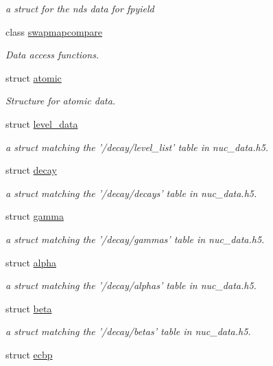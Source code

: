 \begin{DoxyCompactItemize}
\begin{DoxyCompactList}\small\item\em a struct for the nds data for fpyield \end{DoxyCompactList}\item 
class \hyperlink{classpyne_1_1swapmapcompare}{swapmapcompare}
\begin{DoxyCompactList}\small\item\em Data access functions. \end{DoxyCompactList}\item 
struct \hyperlink{structpyne_1_1atomic}{atomic}
\begin{DoxyCompactList}\small\item\em Structure for atomic data. \end{DoxyCompactList}\item 
struct \hyperlink{structpyne_1_1level__data}{level\-\_\-data}
\begin{DoxyCompactList}\small\item\em a struct matching the '/decay/level\-\_\-list' table in nuc\-\_\-data.\-h5. \end{DoxyCompactList}\item 
struct \hyperlink{structpyne_1_1decay}{decay}
\begin{DoxyCompactList}\small\item\em a struct matching the '/decay/decays' table in nuc\-\_\-data.\-h5. \end{DoxyCompactList}\item 
struct \hyperlink{structpyne_1_1gamma}{gamma}
\begin{DoxyCompactList}\small\item\em a struct matching the '/decay/gammas' table in nuc\-\_\-data.\-h5. \end{DoxyCompactList}\item 
struct \hyperlink{structpyne_1_1alpha}{alpha}
\begin{DoxyCompactList}\small\item\em a struct matching the '/decay/alphas' table in nuc\-\_\-data.\-h5. \end{DoxyCompactList}\item 
struct \hyperlink{structpyne_1_1beta}{beta}
\begin{DoxyCompactList}\small\item\em a struct matching the '/decay/betas' table in nuc\-\_\-data.\-h5. \end{DoxyCompactList}\item 
struct \hyperlink{structpyne_1_1ecbp}{ecbp}

\end{DoxyCompactItemize}
